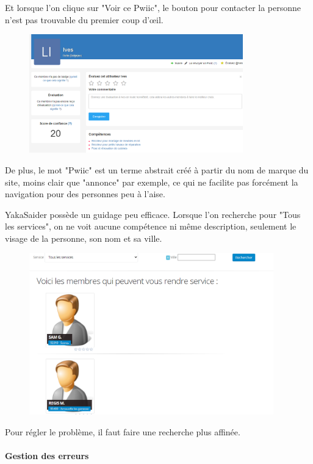 \documentclass[a4paper,11pt]{article}
\begin{document}
Et lorsque l’on clique sur "Voir ce Pwiic", le bouton pour contacter la personne n’est pas trouvable du premier coup d’œil.\\

\begin{figure}[H]
  \includegraphics[width=350px]{images/voir-ce-pwiic.png}
  \label{fig:voir-ce-pwiic}
\end{figure}

De plus, le mot "Pwiic" est un terme abstrait créé à partir du nom de marque du site, moins clair que "annonce"
par exemple, ce qui ne facilite pas forcément la navigation pour des personnes peu à l’aise.

YakaSaider possède un guidage peu efficace. Lorsque l’on recherche pour "Tous les services", on ne voit aucune
compétence ni même description, seulement le visage de la personne, son nom et sa ville.\\

\begin{figure}[H]
  \includegraphics[width=400px]{images/guidage-yakasaider.png}
  \label{fig:guidage-yakasaider}
\end{figure}

Pour régler le problème, il faut faire une recherche plus affinée.\\

\paragraph{Gestion des erreurs}
\end{document}
